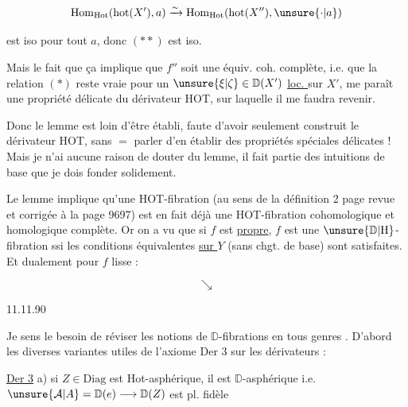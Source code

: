 \[
\mathrm{Hom}_{\mathrm{Hot}}(\mathrm{hot}(X'),a)\xrightarrow{\sim}
\mathrm{Hom}_{\mathrm{Hot}}(\mathrm{hot}(X''),\unsure{\cdot|a})
\]

est iso pour tout $a$, donc $(**)$ est iso.

Mais le fait que ça implique que $f''$ soit une équiv.  coh. complète, i.e. que la relation $(*)$ reste vraie pour un $\unsure{\xi|\zeta}\in\mathbb D(X')$ \uline{loc. } sur $X'$, me paraît une  propriété délicate du dérivateur HOT, sur laquelle il me faudra revenir.

Donc le lemme est loin d'être établi, faute d'avoir seulement construit le dérivateur HOT, sans $=$ parler d'en établir des propriétés spéciales délicates ! Mais je n'ai aucune raison de douter du lemme, il fait partie  des intuitions de base que je  dois  fonder solidement.



Le lemme implique qu'une HOT-fibration  (au sens de la définition 2 page   revue et corrigée à la page 96\unsure{,|-}97) est en fait déjà une HOT-fibration cohomologique et homologique complète. Or on a vu que si $f$ est \uline{propre}, $f$ est une $\unsure{\mathbb D|\mathrm{H}}$-fibration ssi les conditions équivalentes \uline{sur $Y$} (sans chgt. de base) sont satisfaites. Et dualement pour $f$ lisse :


\[
\searrow
\]

11.11.90

Je sens le besoin de réviser  les notions de $\mathbb D$-fibrations en tous genres . D'abord les diverses variantes utiles de l'axiome Der 3 sur les dérivateurs :


\uline{Der 3} a) si $Z\in\mathrm{Diag}$ est Hot-asphérique, il est $\mathbb D$-asphérique i.e. $\unsure{\mathcal A|A}=\mathbb D(e)\longrightarrow\mathbb D(Z)$ est pl. fidèle

